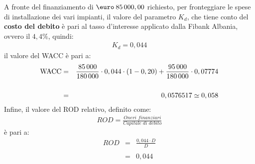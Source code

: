 	A fronte del finanziamento di $\mbox{\euro} \: 85\thinspace 000,00$ richiesto, per fronteggiare le spese di installazione dei vari impianti, il valore del parametro $K_d$, che tiene conto del \textbf{costo del debito} è pari al tasso d'interesse applicato dalla \ac{Fibank Albania}, ovvero il $4,4 \%$, quindi:  
	\begin{equation}
	\label{eq:kd_fibank}
	\begin{split}
		K_d = 0,044
	\end{split}
	\end{equation} 	
	 il valore del \ac{WACC} è pari a:
	\begin{eqnarray}
	\label{eq:wacc_tax_value}
		\mbox{WACC} & = & \frac{85\thinspace 000}{180\thinspace 000} \cdot 0,044 \cdot ( 1 - 0,20 ) + \frac{95\thinspace 000}{180\thinspace 000} \cdot 0,07774 \nonumber \\
		\nonumber \\
			 & = & 0,0576517 \simeq 0,058
	\end{eqnarray}
	Infine, il valore del \ac{ROD} relativo, definito come:
	\begin{equation}
	\label{eq:rod_definizione}
	\begin{split}
		ROD = \frac{\textit{Oneri finanziari}}{\textit{Capitale di debito}} 
	\end{split}
	\end{equation}
	è pari a:
	\begin{eqnarray}
	\label{eq:rod_calcolo}	
		ROD & = & \frac{0,044 \cdot D}{D} \nonumber \\
										   \nonumber \\
			& = & 0,044	
	\end{eqnarray}
